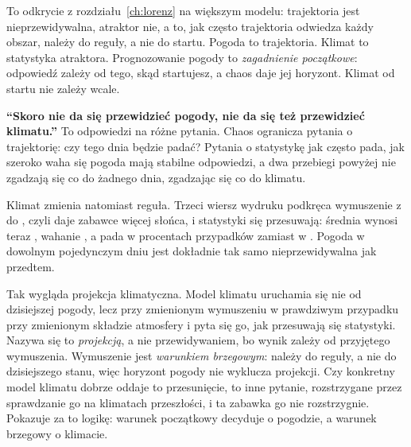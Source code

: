 
\noindent
To odkrycie z rozdziału~\ref{ch:lorenz} na większym modelu: trajektoria jest
nieprzewidywalna, atraktor nie, a to, jak często trajektoria odwiedza każdy
obszar, należy do reguły, a nie do startu. Pogoda to trajektoria. Klimat to
statystyka atraktora. Prognozowanie pogody to \emph{zagadnienie początkowe}:
odpowiedź zależy od tego, skąd startujesz, a chaos daje jej horyzont. Klimat
od startu nie zależy wcale.

\begin{trapbox}
\textbf{\enquote{Skoro nie da się przewidzieć pogody, nie da się też
przewidzieć klimatu.}} To odpowiedzi na różne pytania. Chaos ogranicza
pytania o trajektorię: czy tego dnia będzie padać? Pytania o statystykę
\dash{} jak często pada, jak szeroko waha się pogoda \dash{} mają stabilne
odpowiedzi, a dwa przebiegi powyżej nie zgadzają się co do żadnego dnia,
zgadzając się co do klimatu.
\end{trapbox}

\noindent
Klimat zmienia natomiast reguła. Trzeci wiersz wydruku podkręca wymuszenie z
 do , czyli daje zabawce więcej słońca, i
statystyki się przesuwają: średnia wynosi teraz ,
wahanie , a pada w  procentach
przypadków zamiast w . Pogoda w dowolnym pojedynczym
dniu jest dokładnie tak samo nieprzewidywalna jak przedtem.


\noindent
Tak wygląda projekcja klimatyczna. Model klimatu uruchamia się nie od
dzisiejszej pogody, lecz przy zmienionym wymuszeniu \dash{} w prawdziwym
przypadku przy zmienionym składzie atmosfery \dash{} i pyta się go, jak
przesuwają się statystyki. Nazywa się to \emph{projekcją}, a nie
przewidywaniem, bo wynik zależy od przyjętego wymuszenia. Wymuszenie jest
\emph{warunkiem brzegowym}: należy do reguły, a nie do dzisiejszego stanu,
więc horyzont pogody nie wyklucza projekcji. Czy konkretny model klimatu
dobrze oddaje to przesunięcie, to inne pytanie, rozstrzygane przez
sprawdzanie go na klimatach przeszłości, i ta zabawka go nie rozstrzygnie.
Pokazuje za to logikę: warunek początkowy decyduje o pogodzie, a warunek
brzegowy o klimacie.

